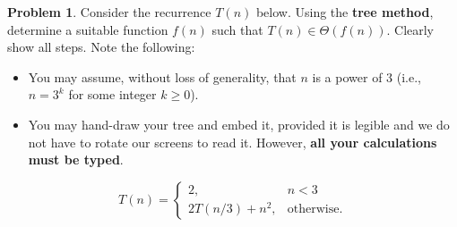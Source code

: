\documentclass[11pt]{article}
\theoremstyle{definition}
\theoremstyle{definition}
\newtheorem{required}{Problem}
\theoremstyle{definition}
\begin{document}
\begin{required}
Consider the recurrence $T(n)$ below. Using the {\bf tree method}, determine a suitable function $f(n)$ such that $T(n) \in \Theta(f(n))$. Clearly show all steps. Note the following:
\begin{itemize}
\item You may assume, without loss of generality, that $n$ is a power of $3$ (i.e., $n = 3^{k}$ for some integer $k \geq 0$).
\item You may hand-draw your tree and embed it, provided it is legible and we do not have to rotate our screens to read it. However, \textbf{all your calculations must be typed}.
\end{itemize}

\[
T(n) = \begin{cases} 2, &  n < 3 \\ 
2T(n/3) + n^{2}, &  \text{otherwise.} \end{cases}
\]

\end{required}
\end{document}
